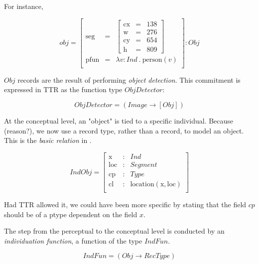 \documentclass[11pt, a4paper]{article}
\begin{document}
For instance,

\begin{equation}\label{eq:objrec}
obj =
\left[\begin{array}{rcl}
\text{seg} &=& \left[\begin{array}{rcl}
\text{cx} &=& 138\\
\text{w} &=& 276\\
\text{cy} &=& 654\\
\text{h} &=& 809
\end{array}\right]\\
\text{pfun} &=& \lambda v:Ind\ .\ \text{person}(v)\\
\end{array}\right] : Obj\end{equation}

$Obj$ records are the result of performing \textit{object detection}.
This commitment is expressed in TTR as the function type $ObjDetector$:

\begin{equation}\label{eq:objdetector}
ObjDetector = ( Image \rightarrow [Obj] )
\end{equation}

At the conceptual level, an "object" is tied to a specific individual.
Because (reason?), we now use a record type, rather than a record, to model an object.
This is the \textit{basic relation} in \cite{LoganComputationalAnalysisApprehension1996}.

\begin{equation}\label{eq:indobj}
IndObj = \left[\begin{array}{rcl}
\text{x} &:& Ind \\
\text{loc} &:& Segment \\
\text{cp} &:& Type \\
\text{cl} &:& \text{location}(\text{x}, \text{loc}) \\
\end{array}\right]
\end{equation}

Had TTR allowed it, we could have been more specific by stating that the field $cp$ should be of a ptype dependent on the field $x$.

The step from the perceptual to the conceptual level is conducted by an \textit{individuation function}, a function of the type $IndFun$.

\begin{equation}\label{eq:indfun}
IndFun = ( Obj \rightarrow RecType )
\end{equation}
\end{document}
